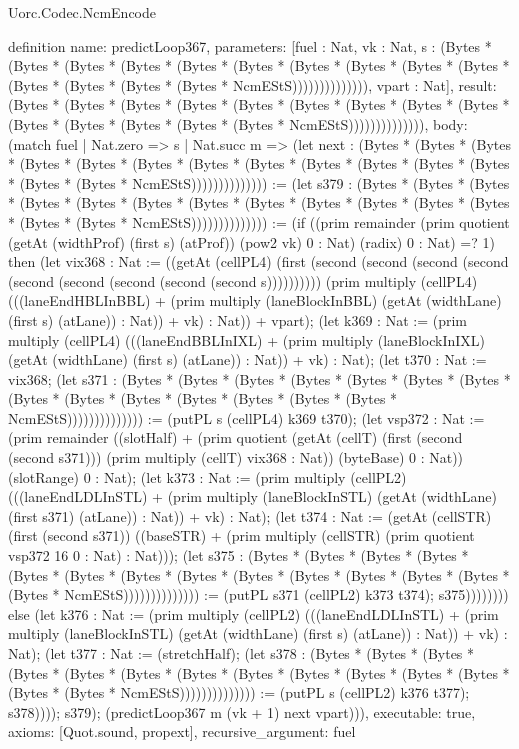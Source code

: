 \begin{lexlean}{Uorc.Codec.NcmEncode}
\begin{semanticmodule}
definition{
  name: predictLoop367,
  parameters: [fuel : Nat, vk : Nat, s : (Bytes * (Bytes * (Bytes * (Bytes * (Bytes * (Bytes * (Bytes * (Bytes * (Bytes * (Bytes * (Bytes * (Bytes * (Bytes * (Bytes * NcmEStS)))))))))))))), vpart : Nat],
  result: (Bytes * (Bytes * (Bytes * (Bytes * (Bytes * (Bytes * (Bytes * (Bytes * (Bytes * (Bytes * (Bytes * (Bytes * (Bytes * (Bytes * NcmEStS)))))))))))))),
  body: (match fuel
    | Nat.zero => s
    | Nat.succ m => (let next : (Bytes * (Bytes * (Bytes * (Bytes * (Bytes * (Bytes * (Bytes * (Bytes * (Bytes * (Bytes * (Bytes * (Bytes * (Bytes * (Bytes * NcmEStS)))))))))))))) := (let s379 : (Bytes * (Bytes * (Bytes * (Bytes * (Bytes * (Bytes * (Bytes * (Bytes * (Bytes * (Bytes * (Bytes * (Bytes * (Bytes * (Bytes * NcmEStS)))))))))))))) := (if ((prim remainder (prim quotient (getAt (widthProf) (first s) (atProf)) (pow2 vk) 0 : Nat) (radix) 0 : Nat) =? 1) then (let vix368 : Nat := ((getAt (cellPL4) (first (second (second (second (second (second (second (second (second (second s)))))))))) (prim multiply (cellPL4) (((laneEndHBLInBBL) + (prim multiply (laneBlockInBBL) (getAt (widthLane) (first s) (atLane)) : Nat)) + vk) : Nat)) + vpart); (let k369 : Nat := (prim multiply (cellPL4) (((laneEndBBLInIXL) + (prim multiply (laneBlockInIXL) (getAt (widthLane) (first s) (atLane)) : Nat)) + vk) : Nat); (let t370 : Nat := vix368; (let s371 : (Bytes * (Bytes * (Bytes * (Bytes * (Bytes * (Bytes * (Bytes * (Bytes * (Bytes * (Bytes * (Bytes * (Bytes * (Bytes * (Bytes * NcmEStS)))))))))))))) := (putPL s (cellPL4) k369 t370); (let vsp372 : Nat := (prim remainder ((slotHalf) + (prim quotient (getAt (cellT) (first (second (second s371))) (prim multiply (cellT) vix368 : Nat)) (byteBase) 0 : Nat)) (slotRange) 0 : Nat); (let k373 : Nat := (prim multiply (cellPL2) (((laneEndLDLInSTL) + (prim multiply (laneBlockInSTL) (getAt (widthLane) (first s371) (atLane)) : Nat)) + vk) : Nat); (let t374 : Nat := (getAt (cellSTR) (first (second s371)) ((baseSTR) + (prim multiply (cellSTR) (prim quotient vsp372 16 0 : Nat) : Nat))); (let s375 : (Bytes * (Bytes * (Bytes * (Bytes * (Bytes * (Bytes * (Bytes * (Bytes * (Bytes * (Bytes * (Bytes * (Bytes * (Bytes * (Bytes * NcmEStS)))))))))))))) := (putPL s371 (cellPL2) k373 t374); s375)))))))) else (let k376 : Nat := (prim multiply (cellPL2) (((laneEndLDLInSTL) + (prim multiply (laneBlockInSTL) (getAt (widthLane) (first s) (atLane)) : Nat)) + vk) : Nat); (let t377 : Nat := (stretchHalf); (let s378 : (Bytes * (Bytes * (Bytes * (Bytes * (Bytes * (Bytes * (Bytes * (Bytes * (Bytes * (Bytes * (Bytes * (Bytes * (Bytes * (Bytes * NcmEStS)))))))))))))) := (putPL s (cellPL2) k376 t377); s378)))); s379); (predictLoop367 m (vk + 1) next vpart))),
  executable: true,
  axioms: [Quot.sound, propext],
  recursive_argument: fuel
}


\end{semanticmodule}
\end{lexlean}
